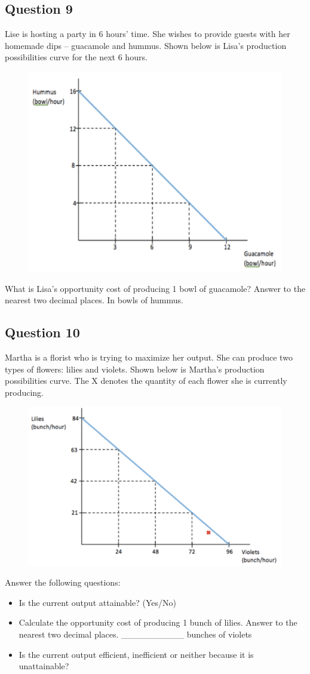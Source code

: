 \subsection{Question 9}
Lise is hosting a party in 6 hours' time. She wishes to provide guests with her homemade dips -- guacamole and hummus. Shown below is Lisa's production possibilities curve for the next 6 hours.
\begin{figure}[H]
	\centering
	\includegraphics[width=0.5\linewidth]{cml_1_9}
\end{figure}
What is Lisa's opportunity cost of producing 1 bowl of guacamole? Answer to the nearest two decimal places. In bowls of hummus.

\subsection{Question 10}
Martha is a florist who is trying to maximize her output. She can produce two types of flowers: lilies and violets. Shown below is Martha's production possibilities curve. The X denotes the quantity of each flower she is currently producing.
\begin{figure}[H]
	\centering
	\includegraphics[width=0.5\linewidth]{cml_1_10}
\end{figure}
Answer the following questions:
\begin{itemize}
	\item Is the current output attainable? (Yes/No)
	\item Calculate the opportunity cost of producing 1 bunch of lilies. Answer to the nearest two decimal places. \_\_\_\_\_\_\_\_\_\_ bunches of violets
	\item Is the current output efficient, inefficient or neither because it is unattainable?
\end{itemize}